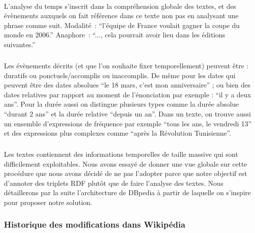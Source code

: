 \documentclass[12pt,a4	]{report}
\begin{document}
\paragraph{}
L’analyse du temps s’inscrit dans la compréhension globale des textes, et des évènements auxquels on fait référence dans ce texte non pas en analysant une phrase comme suit. 
\newline
Modalité~: ``l’équipe de France voulait gagner la coupe du monde en 2006.'' 
\newline
Anaphore~:  ``..., cela pourrait avoir lieu dans les éditions suivantes.''
\subparagraph{}
Les évènements décrits (et que l’on souhaite fixer temporellement) peuvent être : duratifs ou ponctuels/accomplis ou inaccomplis. 
De même pour les dates qui peuvent être des dates absolues ``le 18 mars, c'est mon anniversaire'' ; ou bien des dates relatives par rapport au moment de l’énonciation par exemple : ``il y a deux ans''. Pour la durée aussi on distingue plusieurs types comme la durée absolue ``durant 2 ans'' et la durée relative ``depuis un an''. Dans un texte, on trouve aussi un ensemble d'expressions de fréquence par exemple ``tous les ans, le vendredi 13'' et des expressions plus complexes comme ``après la Révolution Tunisienne''.
\subparagraph{}
Les textes contiennent des informations temporelles de taille massive qui sont difficilement exploitables. Nous avons essayé de donner une vue globale sur cette procédure que nous avons décidé de ne pas l'adopter parce que notre objectif est d'annoter des triplets RDF plutôt que de faire l'analyse des textes. Nous détaillerons par la suite l'architecture de DBpedia à partir de laquelle on s'inspire pour proposer notre solution.
\subsubsection*{Historique des modifications dans Wikipédia}
\end{document}
